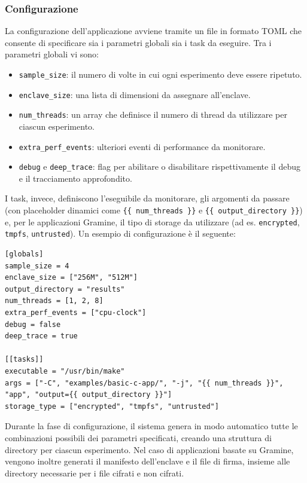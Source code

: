 \documentclass{article}
\begin{document}
\subsubsection{Configurazione}
La configurazione dell'applicazione avviene tramite un file in formato TOML che consente di specificare sia i parametri globali sia i task da eseguire. Tra i parametri globali vi sono:
\begin{itemize}
  \item \texttt{sample\_size}: il numero di volte in cui ogni esperimento deve essere ripetuto.
  \item \texttt{enclave\_size}: una lista di dimensioni da assegnare all'enclave.
  \item \texttt{num\_threads}: un array che definisce il numero di thread da utilizzare per ciascun esperimento.
  \item \texttt{extra\_perf\_events}: ulteriori eventi di performance da monitorare.
  \item \texttt{debug} e \texttt{deep\_trace}: flag per abilitare o disabilitare rispettivamente il debug e il tracciamento approfondito.
\end{itemize}
I task, invece, definiscono l'eseguibile da monitorare, gli argomenti da passare (con placeholder dinamici come \texttt{\{\{ num\_threads \}\}} e \texttt{\{\{ output\_directory \}\}}) e, per le applicazioni Gramine, il tipo di storage da utilizzare (ad es. \texttt{encrypted}, \texttt{tmpfs}, \texttt{untrusted}). Un esempio di configurazione è il seguente:
\begin{verbatim}
[globals]
sample_size = 4
enclave_size = ["256M", "512M"]
output_directory = "results"
num_threads = [1, 2, 8]
extra_perf_events = ["cpu-clock"]
debug = false
deep_trace = true

[[tasks]]
executable = "/usr/bin/make"
args = ["-C", "examples/basic-c-app/", "-j", "{{ num_threads }}", "app", "output={{ output_directory }}"]
storage_type = ["encrypted", "tmpfs", "untrusted"]
\end{verbatim}

Durante la fase di configurazione, il sistema genera in modo automatico tutte le combinazioni possibili dei parametri specificati, creando una struttura di directory per ciascun esperimento. Nel caso di applicazioni basate su Gramine, vengono inoltre generati il manifesto dell'enclave e il file di firma, insieme alle directory necessarie per i file cifrati e non cifrati.

\clearpage
\pagestyle{plain}
\setcounter{page}{1}


\end{document}
